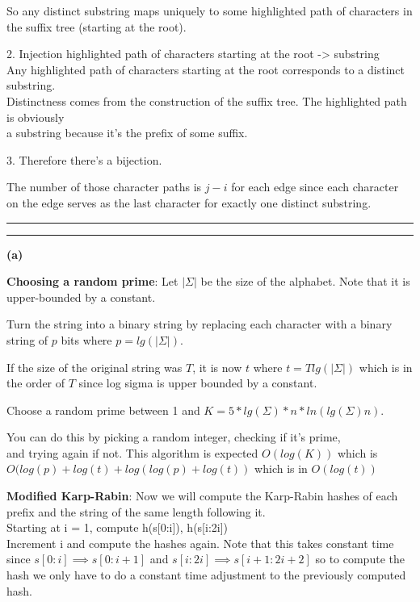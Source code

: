 \documentclass[11pt]{article}
\newcommand{\question}[2] {\vspace{.25in} \hrule\vspace{0.5em}
\noindent{\bf #1: #2} \vspace{0.5em}
\hrule \vspace{.10in}}
\renewcommand{\part}[1] {\vspace{.10in} {\bf (#1)}}
\begin{document}
So any distinct substring maps uniquely to some highlighted path of characters in the suffix tree (starting at the root).


2. Injection highlighted path of characters starting at the root -> substring\\
Any highlighted path of characters starting at the root corresponds to a distinct substring.\\
Distinctness comes from the construction of the suffix tree. The highlighted path is obviously\\
a substring because it's the prefix of some suffix.

3. Therefore there's a bijection.

The number of those character paths is $j-i$ for each edge since each character on the edge serves as the last character for exactly one distinct substring.





\question{3}{LDIS}
\part{a}

\textbf{Choosing a random prime}:
Let $|\Sigma|$ be the size of the alphabet. Note that it is upper-bounded by a constant.

Turn the string into a binary string by replacing each character with a binary string of $p$ bits where $p = lg(|\Sigma|)$.

If the size of the original string was $T$, it is now $t$ where $t = T lg(|\Sigma|)$ which is in the order of $T$ since log sigma is upper bounded by a constant.

Choose a random prime between 1 and $K = 5*lg(\Sigma)*n*ln(lg(\Sigma)n)$.

You can do this by picking a random integer, checking if it's prime,\\
and trying again if not. This algorithm is expected $O(log(K))$ which is $O(log(p) + log(t) + log(log(p) + log(t))$ which is in $O(log(t))$

\textbf{Modified Karp-Rabin}:
Now we will compute the Karp-Rabin hashes of each prefix and the string of the same length following it.\\
Starting at i = 1, compute h(s[0:i]), h(s[i:2i])\\
Increment i and compute the hashes again. Note that this takes constant time since $s[0:i] \implies s[0:i+1]$ and $s[i:2i] \implies s[i+1:2i+2]$ so to compute the hash we only have to do a constant time adjustment to the previously computed hash.
\end{document}
